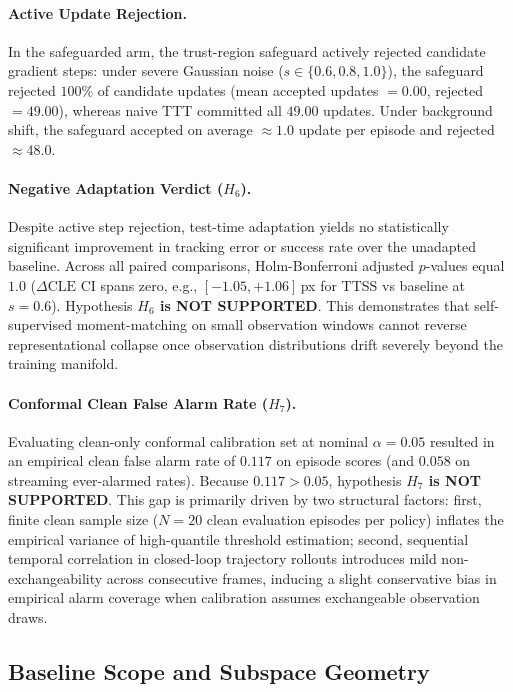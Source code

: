 

\paragraph{Active Update Rejection.}
In the safeguarded arm, the trust-region safeguard actively rejected candidate gradient steps:
under severe Gaussian noise ($s \in \{0.6, 0.8, 1.0\}$), the safeguard rejected $100\%$ of candidate updates (mean accepted updates $= 0.00$, rejected $= 49.00$), whereas naive TTT committed all $49.00$ updates.
Under background shift, the safeguard accepted on average $\approx 1.0$ update per episode and rejected $\approx 48.0$.

\paragraph{Negative Adaptation Verdict ($H_6$).}
Despite active step rejection, test-time adaptation yields no statistically significant improvement in tracking error or success rate over the unadapted baseline.
Across all paired comparisons, Holm-Bonferroni adjusted $p$-values equal \textbf{$1.0$} ($\Delta\text{CLE}$ CI spans zero, e.g., $[-1.05, +1.06]$\,px for TTSS vs baseline at $s = 0.6$).
Hypothesis \textbf{$H_6$ is NOT SUPPORTED}.
This demonstrates that self-supervised moment-matching on small observation windows cannot reverse representational collapse once observation distributions drift severely beyond the training manifold.

\paragraph{Conformal Clean False Alarm Rate ($H_7$).}
Evaluating clean-only conformal calibration set at nominal $\alpha = 0.05$ resulted in an empirical clean false alarm rate of $0.117$ on episode scores (and $0.058$ on streaming ever-alarmed rates).
Because $0.117 > 0.05$, hypothesis \textbf{$H_7$ is NOT SUPPORTED}.
This gap is primarily driven by two structural factors: first, finite clean sample size ($N = 20$ clean evaluation episodes per policy) inflates the empirical variance of high-quantile threshold estimation; second, sequential temporal correlation in closed-loop trajectory rollouts introduces mild non-exchangeability across consecutive frames, inducing a slight conservative bias in empirical alarm coverage when calibration assumes exchangeable observation draws.

\subsection{Baseline Scope and Subspace Geometry}
\label{sec:results:baselines_grassmann}

